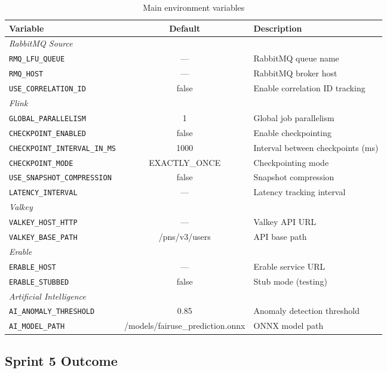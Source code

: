 \begin{table}[H]
    \centering
    \caption{Main environment variables}
    \label{tab:env-vars}
    \begin{tabularx}{\textwidth}{l c X}
\toprule
\textbf{Variable} & \textbf{Default} & \textbf{Description} \\
\midrule
\multicolumn{3}{l}{\textit{RabbitMQ Source}} \\
\texttt{RMQ\_LFU\_QUEUE} & --- & RabbitMQ queue name \\
\texttt{RMQ\_HOST} & --- & RabbitMQ broker host \\
\texttt{USE\_CORRELATION\_ID} & false & Enable correlation ID tracking \\
\midrule
\multicolumn{3}{l}{\textit{Flink}} \\
\texttt{GLOBAL\_PARALLELISM} & 1 & Global job parallelism \\
\texttt{CHECKPOINT\_ENABLED} & false & Enable checkpointing \\
\texttt{CHECKPOINT\_INTERVAL\_IN\_MS} & 1000 & Interval between checkpoints (ms) \\
\texttt{CHECKPOINT\_MODE} & EXACTLY\_ONCE & Checkpointing mode \\
\texttt{USE\_SNAPSHOT\_COMPRESSION} & false & Snapshot compression \\
\texttt{LATENCY\_INTERVAL} & --- & Latency tracking interval \\
\midrule
\multicolumn{3}{l}{\textit{Valkey}} \\
\texttt{VALKEY\_HOST\_HTTP} & --- & Valkey API URL \\
\texttt{VALKEY\_BASE\_PATH} & /pns/v3/users & API base path \\
\midrule
\multicolumn{3}{l}{\textit{Erable}} \\
\texttt{ERABLE\_HOST} & --- & Erable service URL \\
\texttt{ERABLE\_STUBBED} & false & Stub mode (testing) \\
\midrule
\multicolumn{3}{l}{\textit{Artificial Intelligence}} \\
\texttt{AI\_ANOMALY\_THRESHOLD} & 0.85 & Anomaly detection threshold \\
\texttt{AI\_MODEL\_PATH} & /models/fairuse\_prediction.onnx & ONNX model path \\
\bottomrule
    \end{tabularx}
\end{table}

\subsection{Sprint 5 Outcome}

